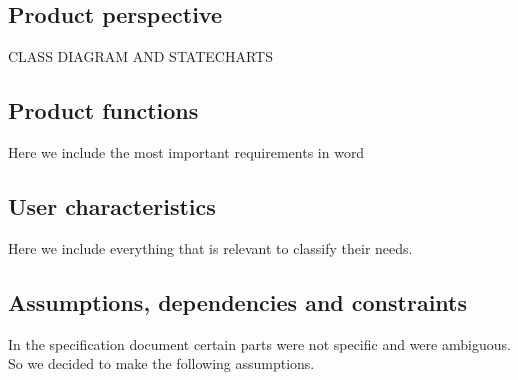 
\subsection{Product perspective}
{\Huge CLASS DIAGRAM AND STATECHARTS}

\subsection{Product functions}
Here we include the most important requirements in word

\subsection{User characteristics}
Here we include everything that is relevant to classify their needs.

\subsection{Assumptions, dependencies and constraints}
In the specification document certain parts were not specific and were ambiguous. So we decided to make the following assumptions.

